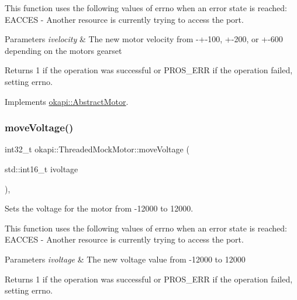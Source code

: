 This function uses the following values of errno when an error state is reached\+: E\+A\+C\+C\+ES -\/ Another resource is currently trying to access the port.


\begin{DoxyParams}{Parameters}
{\em ivelocity} & The new motor velocity from -\/+-\/100, +-\/200, or +-\/600 depending on the motor\textquotesingle{}s gearset \\
\hline
\end{DoxyParams}
\begin{DoxyReturn}{Returns}
1 if the operation was successful or P\+R\+O\+S\+\_\+\+E\+RR if the operation failed, setting errno. 
\end{DoxyReturn}


Implements \mbox{\hyperlink{classokapi_1_1AbstractMotor_a3170268f8d06f728327dcda08505e02b}{okapi\+::\+Abstract\+Motor}}.

\mbox{\label{classokapi_1_1ThreadedMockMotor_a45cf60b263bf3b104e4a2b706fe0b2c7}} 
\subsubsection{\texorpdfstring{moveVoltage()}{moveVoltage()}}
{\footnotesize\ttfamily int32\+\_\+t okapi\+::\+Threaded\+Mock\+Motor\+::move\+Voltage (\begin{DoxyParamCaption}\item[{std\+::int16\+\_\+t}]{ivoltage }\end{DoxyParamCaption})\hspace{0.3cm}{\ttfamily [override]}, {\ttfamily [virtual]}}



Sets the voltage for the motor from -\/12000 to 12000. 

This function uses the following values of errno when an error state is reached\+: E\+A\+C\+C\+ES -\/ Another resource is currently trying to access the port.


\begin{DoxyParams}{Parameters}
{\em ivoltage} & The new voltage value from -\/12000 to 12000 \\
\hline
\end{DoxyParams}
\begin{DoxyReturn}{Returns}
1 if the operation was successful or P\+R\+O\+S\+\_\+\+E\+RR if the operation failed, setting errno. 
\end{DoxyReturn}


